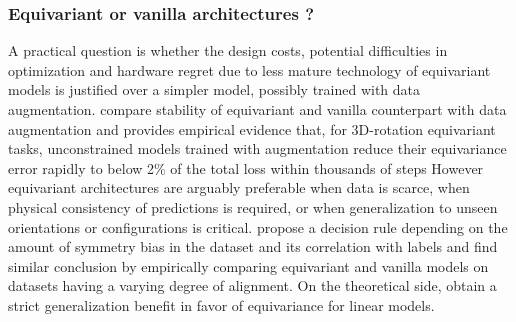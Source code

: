\documentclass[mathematics,review,submit,moreauthors]{Definitions/mdpi}
\begin{document}
\subsubsection{Equivariant or vanilla architectures ?}
A practical question is whether the design costs, potential difficulties in optimization and hardware regret due to less mature technology of equivariant models is justified over a simpler model, possibly trained with data augmentation.
\citet{nordenfors2024} compare stability of equivariant and vanilla counterpart with data augmentation and \citet{shen2026} provides empirical evidence that, for 3D-rotation equivariant tasks, unconstrained models trained with augmentation reduce their equivariance error rapidly to below 2\% of the total loss within thousands of steps
However equivariant architectures are arguably preferable when data is scarce, when physical consistency of predictions is required, or when generalization to unseen orientations or configurations is critical.
\citet{lawrence2026} propose a decision rule depending on the amount of symmetry bias in the dataset and its correlation with labels and \citet{rygiel2026} find similar conclusion by empirically comparing equivariant and vanilla models on datasets having a varying degree of alignment.
On the theoretical side, \citet{elesedy2021p3icml} obtain a strict generalization benefit in favor of equivariance for linear models.
\end{document}
